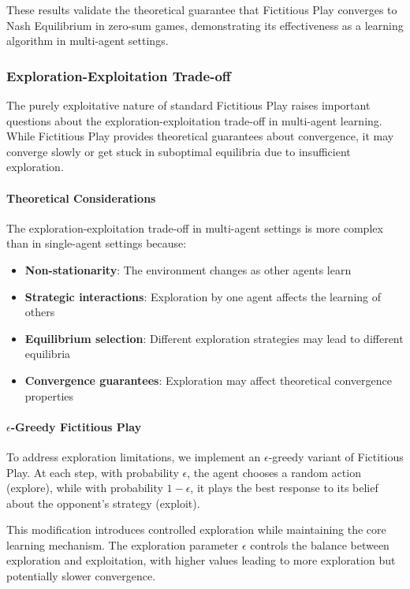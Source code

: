 \documentclass[conference]{IEEEtran}
\begin{document}
These results validate the theoretical guarantee that Fictitious Play converges to Nash Equilibrium in zero-sum games, demonstrating its effectiveness as a learning algorithm in multi-agent settings.

\subsubsection{Exploration-Exploitation Trade-off}

The purely exploitative nature of standard Fictitious Play raises important questions about the exploration-exploitation trade-off in multi-agent learning. While Fictitious Play provides theoretical guarantees about convergence, it may converge slowly or get stuck in suboptimal equilibria due to insufficient exploration.

\paragraph{Theoretical Considerations}

The exploration-exploitation trade-off in multi-agent settings is more complex than in single-agent settings because:

\begin{itemize}
    \item \textbf{Non-stationarity}: The environment changes as other agents learn
    \item \textbf{Strategic interactions}: Exploration by one agent affects the learning of others
    \item \textbf{Equilibrium selection}: Different exploration strategies may lead to different equilibria
    \item \textbf{Convergence guarantees}: Exploration may affect theoretical convergence properties
\end{itemize}

\paragraph{$\epsilon$-Greedy Fictitious Play}

To address exploration limitations, we implement an $\epsilon$-greedy variant of Fictitious Play. At each step, with probability $\epsilon$, the agent chooses a random action (explore), while with probability $1-\epsilon$, it plays the best response to its belief about the opponent's strategy (exploit).

This modification introduces controlled exploration while maintaining the core learning mechanism. The exploration parameter $\epsilon$ controls the balance between exploration and exploitation, with higher values leading to more exploration but potentially slower convergence.
\end{document}
